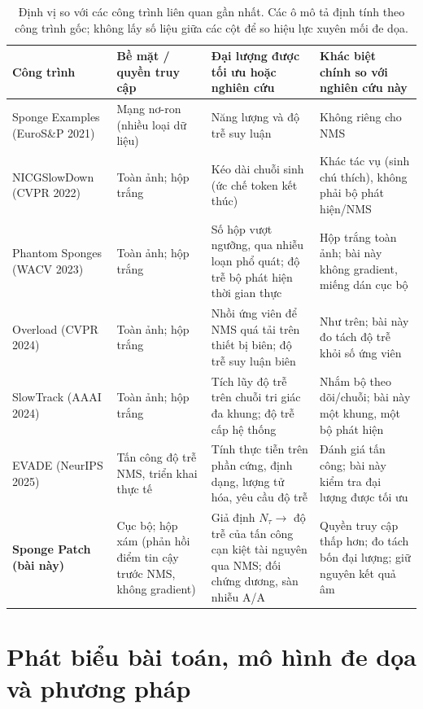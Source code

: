 \documentclass[12pt,a4paper]{article}
\newcommand{\Ntau}{N_{\tau}}
\begin{document}
\begin{table}[t]
\centering\small
\caption{Định vị so với các công trình liên quan gần nhất. Các ô mô tả định tính theo công trình gốc; không lấy số liệu giữa các cột để so hiệu lực xuyên mối đe dọa.}
\label{tab:related}
\begin{tabularx}{\textwidth}{@{}p{2.8cm}p{3.1cm}p{3.6cm}X@{}}
\toprule
Công trình & Bề mặt / quyền truy cập & Đại lượng được tối ưu hoặc nghiên cứu & Khác biệt chính so với nghiên cứu này \\
\midrule
Sponge Examples \cite{shumailov2021sponge} (EuroS\&P 2021) & Mạng nơ-ron (nhiều loại dữ liệu) & Năng lượng và độ trễ suy luận & Không riêng cho NMS \\
NICGSlowDown \cite{nicgslowdown2022} (CVPR 2022) & Toàn ảnh; hộp trắng & Kéo dài chuỗi sinh (ức chế token kết thúc) & Khác tác vụ (sinh chú thích), không phải bộ phát hiện/NMS \\
Phantom Sponges \cite{phantom2023} (WACV 2023) & Toàn ảnh; hộp trắng & Số hộp vượt ngưỡng, qua nhiễu loạn phổ quát; độ trễ bộ phát hiện thời gian thực & Hộp trắng toàn ảnh; bài này không gradient, miếng dán cục bộ \\
Overload \cite{overload2024} (CVPR 2024) & Toàn ảnh; hộp trắng & Nhồi ứng viên để NMS quá tải trên thiết bị biên; độ trễ suy luận biên & Như trên; bài này đo tách độ trễ khỏi số ứng viên \\
SlowTrack \cite{slowtrack2024} (AAAI 2024) & Toàn ảnh; hộp trắng & Tích lũy độ trễ trên chuỗi tri giác đa khung; độ trễ cấp hệ thống & Nhắm bộ theo dõi/chuỗi; bài này một khung, một bộ phát hiện \\
EVADE \cite{evade2025} (NeurIPS 2025) & Tấn công độ trễ NMS, triển khai thực tế & Tính thực tiễn trên phần cứng, định dạng, lượng tử hóa, yêu cầu độ trễ & Đánh giá tấn công; bài này kiểm tra đại lượng được tối ưu \\
\textbf{Sponge Patch (bài này)} & Cục bộ; hộp xám (phản hồi điểm tin cậy trước NMS, không gradient) & Giả định $\Ntau \to$ độ trễ của tấn công cạn kiệt tài nguyên qua NMS; đối chứng dương, sàn nhiễu A/A & Quyền truy cập thấp hơn; đo tách bốn đại lượng; giữ nguyên kết quả âm \\
\bottomrule
\end{tabularx}
\end{table}

\section{Phát biểu bài toán, mô hình đe dọa và phương pháp}
\label{sec:formal}
\end{document}

